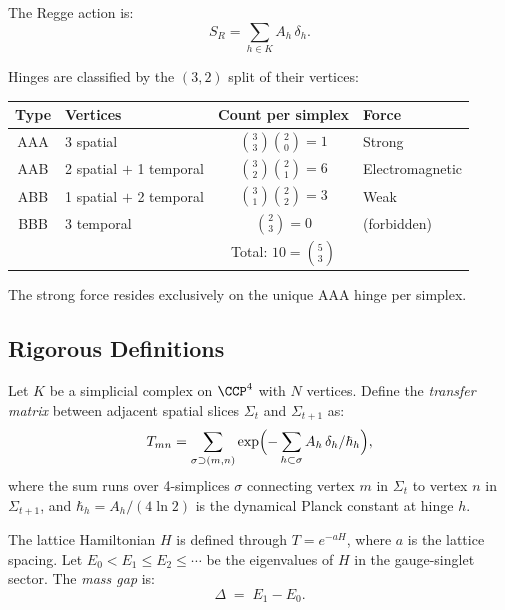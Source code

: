 \noindent
The Regge action \cite{Regge} is:
\begin{equation}
\boxed{S_R = \sum_{h \in K} A_h\, \delta_h.}
\label{eq:Regge_YM}
\end{equation}

Hinges are classified by the $(3,2)$ split of their vertices:

\begin{center}
\begin{tabular}{clcl}
\hline
Type & Vertices & Count per simplex & Force \\
\hline
AAA & 3 spatial & $\binom{3}{3}\binom{2}{0} = 1$ & Strong \\
AAB & 2 spatial $+$ 1 temporal & $\binom{3}{2}\binom{2}{1} = 6$ &
  Electromagnetic \\
ABB & 1 spatial $+$ 2 temporal & $\binom{3}{1}\binom{2}{2} = 3$ &
  Weak \\
BBB & 3 temporal & $\binom{2}{3} = 0$ & (forbidden) \\
\hline
& & Total: $10 = \binom{5}{3}$ & \\
\hline
\end{tabular}
\end{center}

\noindent
The strong force resides exclusively on the unique AAA hinge per simplex.

\subsection{Rigorous Definitions}
\label{sec:definitions}

\begin{definition}
\label{def:transfer}
Let $K$ be a simplicial complex on $\CCP^4$ with $N$ vertices.
Define the \emph{transfer matrix} between adjacent spatial slices
$\Sigma_t$ and $\Sigma_{t+1}$ as:
\begin{equation}
T_{mn} = \sum_{\sigma \supset (m,n)}
  \exp\Bigl(-\sum_{h \subset \sigma} A_h\,\delta_h / \hbar_h\Bigr),
\end{equation}
where the sum runs over 4-simplices $\sigma$ connecting vertex $m$
in $\Sigma_t$ to vertex $n$ in $\Sigma_{t+1}$, and
$\hbar_h = A_h/(4\ln 2)$ is the dynamical Planck constant at hinge $h$.
\end{definition}

\begin{definition}
\label{def:massgap}
The lattice Hamiltonian $H$ is defined through $T = e^{-aH}$, where
$a$ is the lattice spacing.  Let $E_0 < E_1 \leq E_2 \leq \cdots$ be
the eigenvalues of $H$ in the gauge-singlet sector.  The
\emph{mass gap} is:
\begin{equation}
\Delta \;=\; E_1 - E_0.
\end{equation}
\end{definition}


